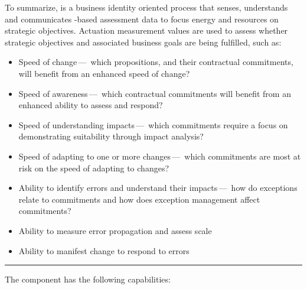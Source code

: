 To summarize, \textbf{} is a business identity oriented process
that senses, understands and communicates -based assessment data to focus energy and
resources on strategic objectives.
Actuation measurement values are used to assess whether strategic objectives and associated business goals are
being fulfilled, such as:

\begin{itemize}
    \item Speed of change\,---\,%
    which propositions, and their contractual commitments, will benefit from an enhanced speed of change?

    \item Speed of awareness\,---\,%
    which contractual commitments will benefit from an enhanced ability to assess and respond?

    \item Speed of understanding impacts\,---\,%
    which commitments require a focus on demonstrating suitability through impact analysis?

    \item Speed of adapting to one or more changes\,---\,%
    which commitments are most at risk on the speed of adapting to changes?

    \item Ability to identify errors and understand their impacts\,---\,%
          how do exceptions relate to commitments and how does exception management affect commitments?
    \item Ability to measure error propagation and assess scale
    \item Ability to manifest change to respond to errors
\end{itemize}

\vspace{1cm}
\hrule

The  component has the following capabilities:

\begin{itemize}[leftmargin=.5in]
\end{itemize}




